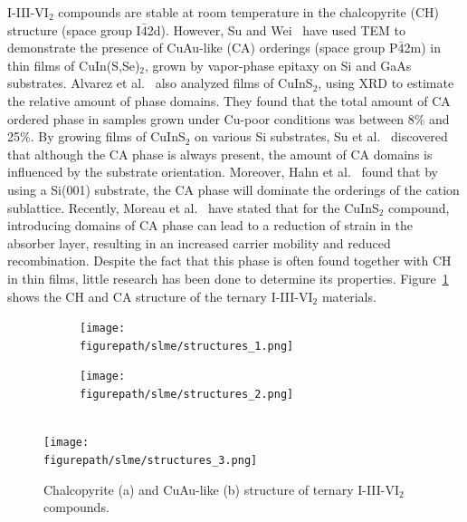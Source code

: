 \begin{refsection}
I-III-VI$_2$ compounds are stable at room temperature in the chalcopyrite (CH) 
structure (space group I$\bar{4}$2d). However, Su and Wei~\cite{Su1999} have 
used TEM to demonstrate the presence of CuAu-like (CA) orderings (space group 
P$\bar{4}$2m) in thin films of CuIn(S,Se)$_2$, grown by vapor-phase epitaxy on 
Si and GaAs substrates.  Alvarez et al.~\cite{Alvarez2002} also analyzed films 
of CuInS$_2$, using XRD to estimate the relative amount of phase domains. They 
found that the total amount of CA ordered phase in samples grown under Cu-poor 
conditions was between 8\% and 25\%. By growing films of CuInS$_2$ on various 
Si substrates, Su et al.~\cite{Su2000} discovered that although the CA phase 
is always present, the amount of CA domains is influenced by the substrate 
orientation. Moreover, Hahn et al.~\cite{Hahn2001} found that by using a 
Si(001) substrate, the CA phase will dominate the orderings of the cation 
sublattice. Recently, Moreau et al.~\cite{Moreau2015} have stated that for the 
CuInS$_2$ compound, introducing domains of CA phase can lead to a reduction of 
strain in the absorber layer, resulting in an increased carrier mobility and 
reduced recombination. Despite the fact that this phase is often found 
together with CH in thin films, little research has been done to determine its 
properties. Figure~\ref{slme:fig-CuAu_structure} shows the CH and CA structure 
of the ternary I-III-VI$_2$ materials. 
 
\begin{figure}[ht]  
\setlength{\captionmargin}{10pt} 
\centering 
\begin{subfigure}{0.24\textwidth} 
\centering 
\texttt{[image: \\figurepath/slme/structures\_1.png]} 
\caption{} 
\end{subfigure}%
\begin{subfigure}{0.24\textwidth} 
\centering 
\texttt{[image: \\figurepath/slme/structures\_2.png]} 
\caption{} 
\end{subfigure} 
\vspace{0.7em}\\ 
\texttt{[image: \\figurepath/slme/structures\_3.png]} 
\caption{\label{slme:fig-CuAu_structure} Chalcopyrite (a) and CuAu-like (b) 
structure of ternary \mbox{I-III-VI$_2$} compounds.} 
\end{figure} 
 

\end{refsection}
